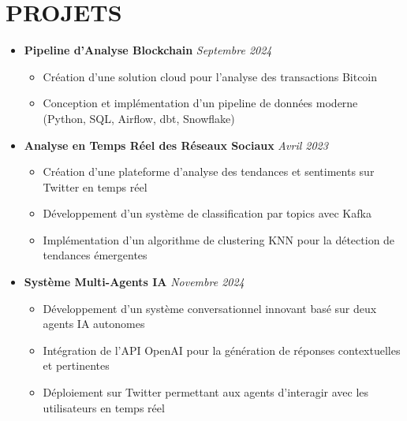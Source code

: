 \documentclass[11pt,a4paper]{article}
\newcommand{\resumeItem}[1]{
  \item\footnotesize{
    {#1 \vspace{-1pt}}
  }
}
\newcommand{\resumeProjectHeading}[2]{
  \item
  {\footnotesize\textbf{#1}} \hfill {\footnotesize\textit{#2}}
}
\newcommand{\resumeSubHeadingListStart}{\begin{itemize}[leftmargin=0in, label={}]}
\newcommand{\resumeSubHeadingListEnd}{\end{itemize}}
\newcommand{\resumeItemListStart}{\begin{itemize}[label={\textbullet}]}
\newcommand{\resumeItemListEnd}{\end{itemize}\vspace{0pt}}
\begin{document}
\section{PROJETS}
\resumeSubHeadingListStart
    \resumeProjectHeading
      {Pipeline d'Analyse Blockchain} {Septembre 2024}
      \resumeItemListStart
        \resumeItem{Création d'une solution cloud pour l'analyse des transactions Bitcoin}
        \resumeItem{Conception et implémentation d'un pipeline de données moderne (Python, SQL, Airflow, dbt, Snowflake)}
      \resumeItemListEnd
    \resumeProjectHeading
      {Analyse en Temps Réel des Réseaux Sociaux} {Avril 2023}
      \resumeItemListStart
        \resumeItem{Création d'une plateforme d'analyse des tendances et sentiments sur Twitter en temps réel}
        \resumeItem{Développement d'un système de classification par topics avec Kafka}
        \resumeItem{Implémentation d'un algorithme de clustering KNN pour la détection de tendances émergentes}
      \resumeItemListEnd
    \resumeProjectHeading
      {Système Multi-Agents IA} {Novembre 2024}
      \resumeItemListStart
        \resumeItem{Développement d'un système conversationnel innovant basé sur deux agents IA autonomes}
        \resumeItem{Intégration de l'API OpenAI pour la génération de réponses contextuelles et pertinentes}
        \resumeItem{Déploiement sur Twitter permettant aux agents d'interagir avec les utilisateurs en temps réel}
      \resumeItemListEnd
\resumeSubHeadingListEnd
\end{document}
